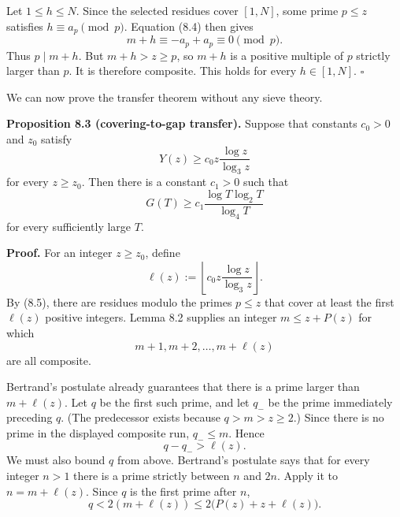 \documentclass[10pt,letterpaper]{article}
\newcommand{\qedmark}{\(\square\)}
\begin{document}
Let $1\le h\le N$. Since the selected residues cover $[1,N]$, some prime $p\le z$ satisfies $h\equiv a_p\pmod p$. Equation
(8.4) then gives
\[
m+h\equiv-a_p+a_p\equiv0\pmod p.
\]
Thus $p\mid m+h$. But $m+h>z\ge p$, so $m+h$ is a positive multiple of $p$ strictly larger than $p$. It is therefore
composite. This holds for every $h\in[1,N]$. \qedmark

We can now prove the transfer theorem without any sieve theory.

\textbf{Proposition 8.3 (covering-to-gap transfer).} Suppose that constants $c_0>0$ and $z_0$ satisfy
\begin{equation}
Y(z)\ge c_0z\frac{\log z}{\log_3 z}
\tag{8.5}
\end{equation}
for every $z\ge z_0$. Then there is a constant $c_1>0$ such that
\begin{equation}
G(T)\ge c_1\frac{\log T\log_2 T}{\log_4 T}
\tag{8.6}
\end{equation}
for every sufficiently large $T$.

\textbf{Proof.} For an integer $z\ge z_0$, define
\begin{equation}
\ell(z):=\left\lfloor c_0z\frac{\log z}{\log_3 z}\right\rfloor.
\tag{8.7}
\end{equation}
By (8.5), there are residues modulo the primes $p\le z$ that cover at least the first $\ell(z)$ positive integers.
Lemma 8.2 supplies an integer $m\le z+P(z)$ for which
\[
m+1,m+2,\ldots,m+\ell(z)
\]
are all composite.

Bertrand's postulate already guarantees that there is a prime larger than $m+\ell(z)$. Let $q$ be the first such
prime, and let $q_-$ be the prime immediately preceding $q$. (The predecessor exists because $q>m>z\ge2$.)
Since there is no prime in the displayed composite run, $q_-\le m$. Hence
\begin{equation}
q-q_->\ell(z).
\tag{8.8}
\end{equation}
We must also bound $q$ from above. Bertrand's postulate says that for every integer $n>1$ there is a prime
strictly between $n$ and $2n$. Apply it to $n=m+\ell(z)$. Since $q$ is the first prime after $n$,
\begin{equation}
q<2(m+\ell(z))\le2\bigl(P(z)+z+\ell(z)\bigr).
\tag{8.9}
\end{equation}
\end{document}
